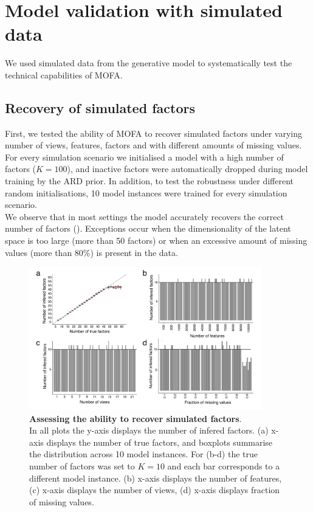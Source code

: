 \graphicspath{{Chapter2/Figs/}}

\section{Model validation with simulated data} \label{section:mofa_simulated}

We used simulated data from the generative model to systematically test the technical capabilities of MOFA.

\subsection{Recovery of simulated factors}

First, we tested the ability of MOFA to recover simulated factors under varying number of views, features, factors and with different amounts of missing values.\\ 
For every simulation scenario we initialised a model with a high number of factors ($K=100$), and inactive factors were automatically dropped during model training by the ARD prior. In addition, to test the robustness under different random initialisations, 10 model instances were trained for every simulation scenario.\\
We observe that in most settings the model accurately recovers the correct number of factors (). Exceptions occur when the dimensionality of the latent space is too large (more than 50 factors) or when an excessive amount of missing values (more than 80\%) is present in the data.

\begin{figure}[H]
	\centering 	
	\includegraphics[width=0.9\textwidth]{MOFA_learnK}
	\caption{\textbf{Assessing the ability to recover simulated factors}.\\
	In all plots the y-axis displays the number of infered factors. (a) x-axis displays the number of true factors, and boxplots summarise the distribution across 10 model instances. For (b-d) the true number of factors was set to $K=10$ and each bar corresponds to a different model instance. (b) x-axis displays the number of features, (c) x-axis displays the number of views, (d) x-axis displays fraction of missing values. }
	\label{fig:MOFA_learnK}
\end{figure}

